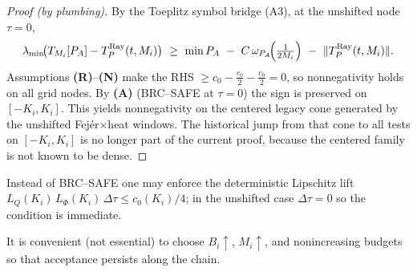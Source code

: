 \begin{proof}[Proof (by plumbing)]
By the Toeplitz symbol bridge (A3), at the unshifted node $\tau=0$,
\begin{equation}\label{eq:ab_infinity_lemma-lambda-min}
\lambda_{\min}\!\big(T_{M_i}[P_A]-T_P^{\mathrm{Ray}}(t,M_i)\big)
\ \ge\ \min P_A\ -\ C\,\omega_{P_A}\!\Bigl(\tfrac{1}{2M_i}\Bigr)\ -\ \|T_P^{\mathrm{Ray}}(t,M_i)\|.
\end{equation}
Assumptions \textbf{(R)}--\textbf{(N)} make the RHS $\ge c_0 - \tfrac{c_0}{2} - \tfrac{c_0}{2}=0$, so nonnegativity holds on all grid nodes.
By \textbf{(A)} (\textup{\textsc{BRC}}--\textup{\textsc{SAFE}} at $\tau=0$) the sign is preserved on $[-K_i,K_i]$.
This yields nonnegativity on the centered legacy cone generated by the unshifted Fej\'er$\times$heat windows.
The historical jump from that cone to all tests on $[-K_i,K_i]$ is no longer part of the current proof, because the centered family is not known to be dense.
\end{proof}

\begin{remark}
Instead of \textup{\textsc{BRC}}--\textup{\textsc{SAFE}} one may enforce the deterministic Lipschitz lift
$L_Q(K_i)\,L_\Phi(K_i)\,\Delta\tau \le c_0(K_i)/4$; in the unshifted case $\Delta\tau=0$ so the condition is immediate.
\end{remark}

\begin{remark}
It is convenient (not essential) to choose $B_i\uparrow$, $M_i\uparrow$, and nonincreasing budgets so that acceptance persists along the chain.
\end{remark}
